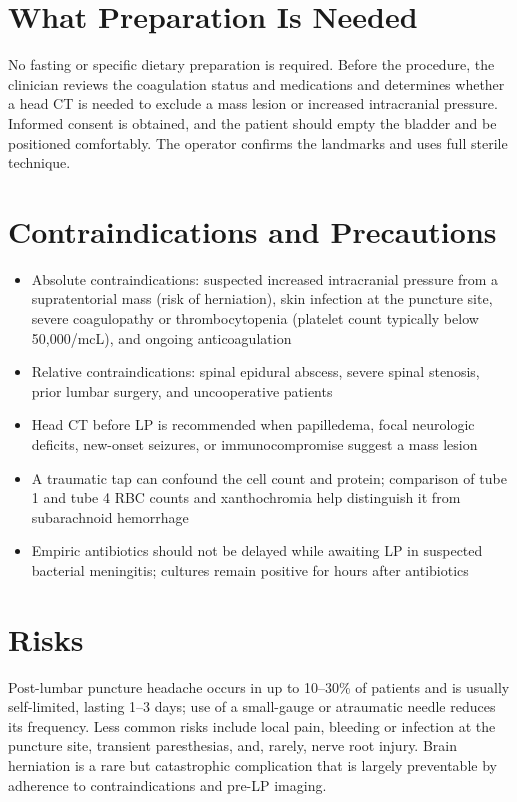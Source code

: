 \section*{What Preparation Is Needed}
No fasting or specific dietary preparation is required. Before the procedure, the clinician reviews the coagulation status and medications and determines whether a head CT is needed to exclude a mass lesion or increased intracranial pressure. Informed consent is obtained, and the patient should empty the bladder and be positioned comfortably. The operator confirms the landmarks and uses full sterile technique.
\section*{Contraindications and Precautions}
\begin{itemize}
  \item Absolute contraindications: suspected increased intracranial pressure from a supratentorial mass (risk of herniation), skin infection at the puncture site, severe coagulopathy or thrombocytopenia (platelet count typically below 50,000/mcL), and ongoing anticoagulation
  \item Relative contraindications: spinal epidural abscess, severe spinal stenosis, prior lumbar surgery, and uncooperative patients
  \item Head CT before LP is recommended when papilledema, focal neurologic deficits, new-onset seizures, or immunocompromise suggest a mass lesion
  \item A traumatic tap can confound the cell count and protein; comparison of tube 1 and tube 4 RBC counts and xanthochromia help distinguish it from subarachnoid hemorrhage
  \item Empiric antibiotics should not be delayed while awaiting LP in suspected bacterial meningitis; cultures remain positive for hours after antibiotics
\end{itemize}
\section*{Risks}
Post-lumbar puncture headache occurs in up to 10--30\% of patients and is usually self-limited, lasting 1--3 days; use of a small-gauge or atraumatic needle reduces its frequency. Less common risks include local pain, bleeding or infection at the puncture site, transient paresthesias, and, rarely, nerve root injury. Brain herniation is a rare but catastrophic complication that is largely preventable by adherence to contraindications and pre-LP imaging.
